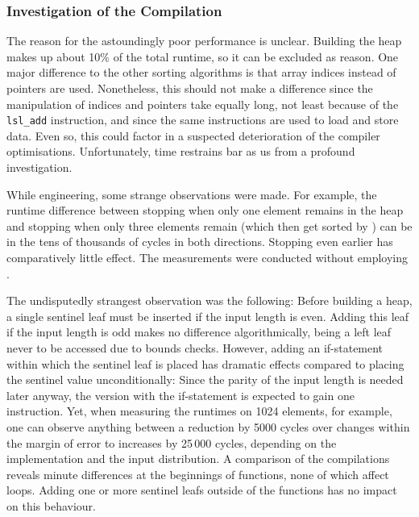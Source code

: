 \subsubsection*{Investigation of the Compilation}
\label{subsubsec:tasklet:heap:compilation}

The reason for the astoundingly poor performance is unclear.
Building the heap makes up about 10\% of the total runtime, so it can be excluded as reason.
One major difference to the other sorting algorithms is that array indices instead of pointers are used.
Nonetheless, this should not make a difference since the manipulation of indices and pointers take equally long, not least because of the \lstinline|lsl_add| instruction, and since the same instructions are used to load and store data.
Even so, this could factor in a suspected deterioration of the compiler optimisations.
Unfortunately, time restrains bar as us from a profound investigation.

While engineering, some strange observations were made.
For example, the runtime difference between stopping \HS{} when only one element remains in the heap and stopping \HS{} when only three elements remain (which then get sorted by \IS{}) can be in the tens of thousands of cycles in both directions.
Stopping \HS{} even earlier has comparatively little effect.
The measurements were conducted without employing \IS{}.

The undisputedly strangest observation was the following:
Before building a heap, a single sentinel leaf must be inserted if the input length is even.
Adding this leaf if the input length is odd makes no difference algorithmically, being a left leaf never to be accessed due to bounds checks.
However, adding an if-statement within which the sentinel leaf is placed has dramatic effects compared to placing the sentinel value unconditionally:
Since the parity of the input length is needed later anyway, the version with the if-statement is expected to gain one instruction.
Yet, when measuring the runtimes on 1024 elements, for example, one can observe anything between a reduction by 5000 cycles over changes within the margin of error to increases by 25\,000 cycles, depending on the implementation and the input distribution.
A comparison of the compilations reveals minute differences at the beginnings of functions, none of which affect loops.
Adding one or more sentinel leafs outside of the functions has no impact on this behaviour.
